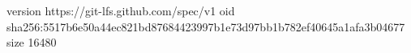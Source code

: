 version https://git-lfs.github.com/spec/v1
oid sha256:5517b6e50a44ec821bd87684423997b1e73d97bb1b782ef40645a1afa3b04677
size 16480
